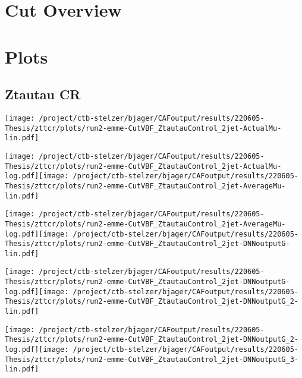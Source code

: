\documentclass{article}
\begin{document}
\section[Cut Overview]{Cut Overview}

\centering


\section[Plots]{Plots}

\centering

\subsection[Ztautau CR]{Ztautau CR}

\centering

\texttt{[image: /project/ctb-stelzer/bjager/CAFoutput/results/220605-Thesis/zttcr/plots/run2-emme-CutVBF\_ZtautauControl\_2jet-ActualMu-lin.pdf]}

\texttt{[image: /project/ctb-stelzer/bjager/CAFoutput/results/220605-Thesis/zttcr/plots/run2-emme-CutVBF\_ZtautauControl\_2jet-ActualMu-log.pdf]}\texttt{[image: /project/ctb-stelzer/bjager/CAFoutput/results/220605-Thesis/zttcr/plots/run2-emme-CutVBF\_ZtautauControl\_2jet-AverageMu-lin.pdf]}

\texttt{[image: /project/ctb-stelzer/bjager/CAFoutput/results/220605-Thesis/zttcr/plots/run2-emme-CutVBF\_ZtautauControl\_2jet-AverageMu-log.pdf]}\texttt{[image: /project/ctb-stelzer/bjager/CAFoutput/results/220605-Thesis/zttcr/plots/run2-emme-CutVBF\_ZtautauControl\_2jet-DNNoutputG-lin.pdf]}

\texttt{[image: /project/ctb-stelzer/bjager/CAFoutput/results/220605-Thesis/zttcr/plots/run2-emme-CutVBF\_ZtautauControl\_2jet-DNNoutputG-log.pdf]}\texttt{[image: /project/ctb-stelzer/bjager/CAFoutput/results/220605-Thesis/zttcr/plots/run2-emme-CutVBF\_ZtautauControl\_2jet-DNNoutputG\_2-lin.pdf]}

\texttt{[image: /project/ctb-stelzer/bjager/CAFoutput/results/220605-Thesis/zttcr/plots/run2-emme-CutVBF\_ZtautauControl\_2jet-DNNoutputG\_2-log.pdf]}\texttt{[image: /project/ctb-stelzer/bjager/CAFoutput/results/220605-Thesis/zttcr/plots/run2-emme-CutVBF\_ZtautauControl\_2jet-DNNoutputG\_3-lin.pdf]}
\end{document}
